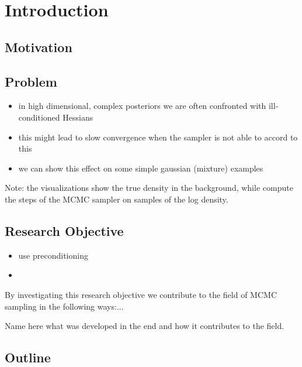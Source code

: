 \section{Introduction} \label{chap:introduction}

\subsection{Motivation}

\subsection{Problem}

\begin{itemize}
    \item in high dimensional, complex posteriors we are often confronted with ill-conditioned Hessians
    \item this might lead to slow convergence when the sampler is not able to accord to this
    \item we can show this effect on some simple gaussian (mixture) examples
\end{itemize}

Note: the visualizations show the true density in the background, while compute the steps of the MCMC sampler on samples of the log density.


\subsection{Research Objective}

\begin{itemize}
    \item use preconditioning
    \item
\end{itemize}

By investigating this research objective we contribute to the field of MCMC sampling in the following ways:...

Name here what was developed in the end and how it contributes to the field.


\subsection{Outline}
